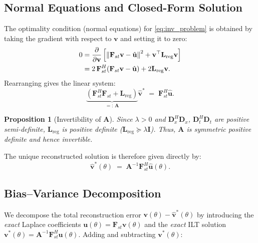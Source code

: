 \documentclass[11pt, a4paper]{article}
\newtheorem{proposition}[theorem]{Proposition}
\newcommand{\norm}[1]{\left\|#1\right\|}
\begin{document}
\subsection{Normal Equations and Closed-Form Solution}

The optimality condition (normal equations) for \eqref{eq:inv_problem} is obtained by taking the gradient with respect to $\mathbf{v}$ and setting it to zero:
\begin{align}
  0 &= \frac{\partial}{\partial \mathbf{v}}
  \left[
    \norm{\mathbf{F}_{st}\mathbf{v} - \hat{\mathbf{u}}}^2
    + \mathbf{v}^\top \mathbf{L}_{\mathrm{reg}} \mathbf{v}
  \right] \notag \\
  &= 2\,\mathbf{F}_{st}^H(\mathbf{F}_{st}\mathbf{v} - \hat{\mathbf{u}})
     + 2\mathbf{L}_{\mathrm{reg}}\mathbf{v}. \notag
\end{align}
Rearranging gives the linear system:
\begin{equation}
  \label{eq:normal}
  \underbrace{
    \left(\mathbf{F}_{st}^H\mathbf{F}_{st}
    + \mathbf{L}_{\mathrm{reg}}\right)
  }_{=:\,\mathbf{A}}
  \hat{\mathbf{v}}^*
  \;=\;
  \mathbf{F}_{st}^H \hat{\mathbf{u}}.
\end{equation}

\begin{proposition}[Invertibility of $\mathbf{A}$]
  \label{prop:invertible}
  Since $\lambda > 0$ and $\mathbf{D}_x^H\mathbf{D}_x$, $\mathbf{D}_t^H\mathbf{D}_t$ are positive semi-definite, $\mathbf{L}_{\mathrm{reg}}$ is positive definite ($\mathbf{L}_{\mathrm{reg}} \succeq \lambda \mathbf{I}$). Thus, $\mathbf{A}$ is symmetric positive definite and hence invertible.
\end{proposition}

The unique reconstructed solution is therefore given directly by:
\begin{equation}
  \label{eq:solution}
  \hat{\mathbf{v}}^*(\theta)
  \;=\;
  \mathbf{A}^{-1}\mathbf{F}_{st}^H \hat{\mathbf{u}}(\theta).
\end{equation}

\subsection{Bias--Variance Decomposition}

We decompose the total reconstruction error $\mathbf{v}(\theta) - \hat{\mathbf{v}}^*(\theta)$ by introducing the \emph{exact} Laplace coefficients $\mathbf{u}(\theta) = \mathbf{F}_{st}\mathbf{v}(\theta)$ and the \emph{exact} ILT solution $\mathbf{v}^*(\theta) = \mathbf{A}^{-1}\mathbf{F}_{st}^H\mathbf{u}(\theta)$. Adding and subtracting $\mathbf{v}^*(\theta)$:
\end{document}
